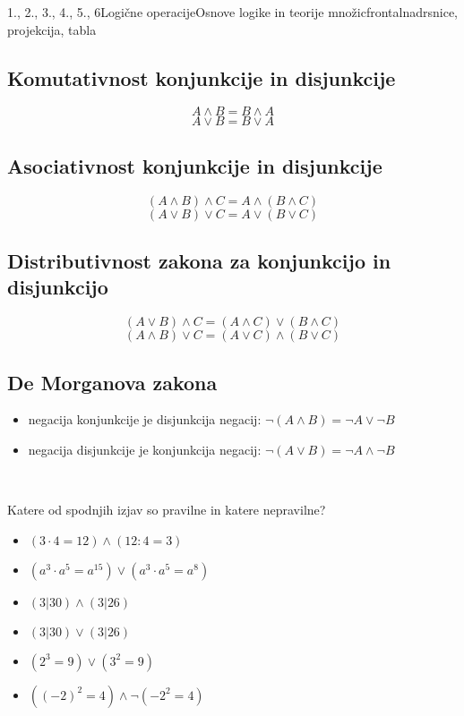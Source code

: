 \begin{priprava}{1., 2., 3., 4., 5., 6}{}{Logične operacije}{Osnove logike in teorije množic}{frontalna}{drsnice, projekcija, tabla}
~


   \subsection*{Komutativnost konjunkcije in disjunkcije}
      $$ A\land B = B\land A $$
      $$ A\lor B = B\lor A$$
         
  
   \subsection*{Asociativnost konjunkcije in disjunkcije}
      $$(A\land B)\land C = A\land(B\land C) $$
      $$ (A\lor B)\lor C = A\lor (B\lor C) $$
   

   \subsection*{Distributivnost zakona za konjunkcijo in disjunkcijo}
      $$(A\lor B)\land C = (A\land C)\lor(B\land C) $$
      $$ (A\land B)\lor C = (A\lor C)\land(B\lor C) $$
   

   \subsection*{De Morganova zakona}
      \begin{itemize}
          \item negacija konjunkcije je disjunkcija negacij: 
              $\lnot(A\land B)=\lnot A\lor\lnot B$
          \item negacija disjunkcije je konjunkcija negacij: 
              $\lnot(A\lor B)=\lnot A\land\lnot B$
      \end{itemize}                
   

      ~



   \begin{naloga}
      Katere od spodnjih izjav so pravilne in katere nepravilne?
      \begin{itemize}
          \item $(3\cdot 4 = 12)\land(12:4=3)$
          \item $(a^3\cdot a^5=a^{15})\lor (a^3\cdot a^5=a^8)$
          \item $(3|30)\land(3|26)$
          \item $(3|30)\lor(3|26)$
          \item $(2^3=9)\lor(3^2=9)$
          \item $((-2)^2=4)\land\lnot(-2^2=4)$
      \end{itemize}
  \end{naloga}




\end{priprava}
